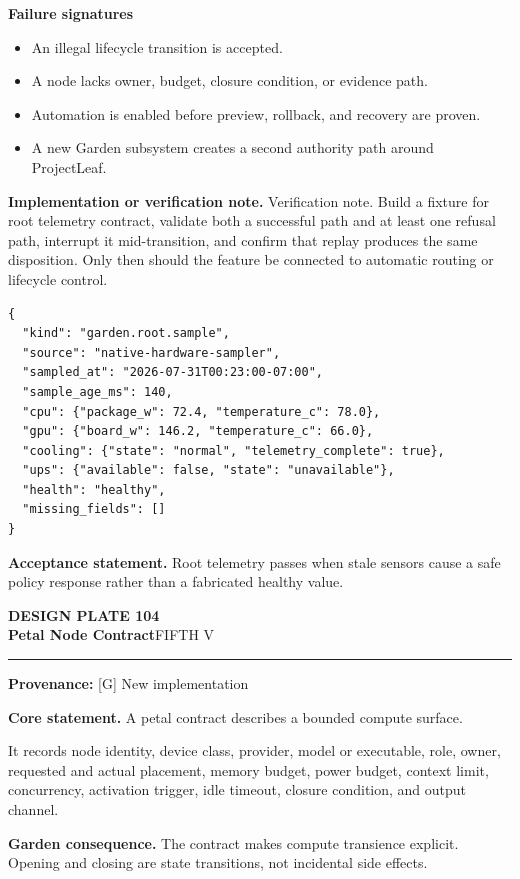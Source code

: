 \documentclass[10pt,letterpaper,oneside]{article}
\newcommand{\prov}[1]{\textcolor{gardenBlue}{\sffamily\footnotesize\textbf{Provenance:} #1}}
\newcommand{\platetitle}[3]{%
  \begin{minipage}[t][0.54in][t]{\textwidth}
  {\sffamily\bfseries\color{gardenDeep}\fontsize{9}{10}\selectfont DESIGN PLATE #1}\\[-1pt]
  {\sffamily\bfseries\color{gardenInk}\fontsize{16.5}{18}\selectfont #2}\hfill{\sffamily\color{gardenGreen}\large #3}
  \end{minipage}\vspace{-2pt}\hrule\vspace{5pt}}
\begin{document}
\textbf{Failure signatures}
\begin{itemize}
\item An illegal lifecycle transition is accepted.
\item A node lacks owner, budget, closure condition, or evidence path.
\item Automation is enabled before preview, rollback, and recovery are proven.
\item A new Garden subsystem creates a second authority path around ProjectLeaf.
\end{itemize}
\textbf{Implementation or verification note.} Verification note. Build a fixture for root telemetry contract, validate both a successful path and at least one refusal path, interrupt it mid-transition, and confirm that replay produces the same disposition. Only then should the feature be connected to automatic routing or lifecycle control.

\begin{lstlisting}
{
  "kind": "garden.root.sample",
  "source": "native-hardware-sampler",
  "sampled_at": "2026-07-31T00:23:00-07:00",
  "sample_age_ms": 140,
  "cpu": {"package_w": 72.4, "temperature_c": 78.0},
  "gpu": {"board_w": 146.2, "temperature_c": 66.0},
  "cooling": {"state": "normal", "telemetry_complete": true},
  "ups": {"available": false, "state": "unavailable"},
  "health": "healthy",
  "missing_fields": []
}
\end{lstlisting}
\begin{acceptbox}
\textbf{Acceptance statement.} Root telemetry passes when stale sensors cause a safe policy response rather than a fabricated healthy value.
\end{acceptbox}
\newpage
\platetitle{104}{Petal Node Contract}{FIFTH V}
\prov{[G] New implementation}
\fontsize{8.85}{10.45}\selectfont
\begin{corebox}
\textbf{Core statement.} A petal contract describes a bounded compute surface.
\end{corebox}
It records node identity, device class, provider, model or executable, role, owner, requested and actual placement, memory budget, power budget, context limit, concurrency, activation trigger, idle timeout, closure condition, and output channel.

\textbf{Garden consequence.} The contract makes compute transience explicit. Opening and closing are state transitions, not incidental side effects.
\end{document}
